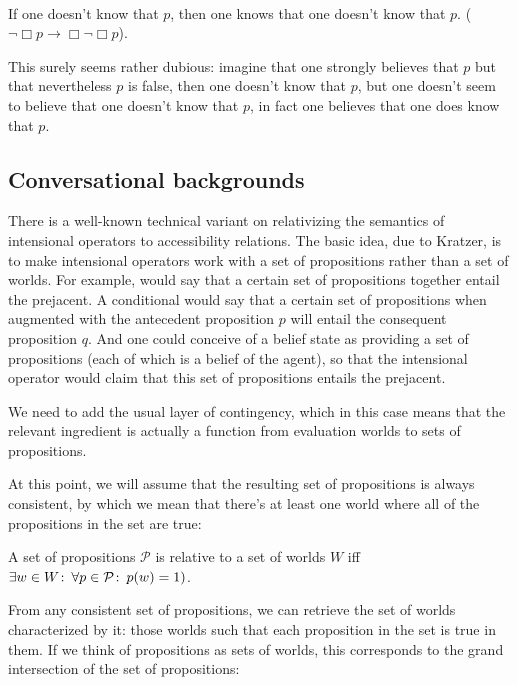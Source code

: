 \ex {}\\
If one doesn't know that $p$, then one knows that one doesn't know that $p$.
($\neg\Box p \rightarrow \Box\neg\Box p$). \xe

This surely seems rather dubious: imagine that one strongly believes that $p$
but that nevertheless $p$ is false, then one doesn't know that $p$, but one
doesn't seem to believe that one doesn't know that $p$, in fact one believes
that one does know that $p$.

\clearpage
\subsection{Conversational backgrounds}
\label{sec:conversational-backgrounds}

%
There is a well-known technical variant on relativizing the semantics of
intensional operators to accessibility relations. The basic idea, due to
Kratzer, is to make intensional operators work with a set of propositions rather
than a set of worlds. For example,  would say that a certain
set of propositions together entail the prejacent. A conditional  would say that a certain set of propositions when augmented with
the antecedent proposition $p$ will entail the consequent proposition $q$.
And one could conceive of a belief state as providing a set of propositions
(each of which is a belief of the agent), so that the intensional operator
 would claim that this set of propositions entails the
prejacent.

We need to add the usual layer of contingency, which in this case means that the
relevant ingredient is actually a function from evaluation worlds to sets of
propositions.

At this point, we will assume that the resulting set of propositions is always
consistent, by which we mean that there's at least one world where all of the
propositions in the set are true:

\ex A set of propositions $\mathcal{P}$ is  relative to a set
of worlds $W$ iff $\exists w\in W\co \forall p\in\mathcal{P}\co p(w)=1)$. \xe

From any consistent set of propositions, we can retrieve the set of worlds
characterized by it: those worlds such that each proposition in the set is true
in them. If we think of propositions as sets of worlds, this corresponds to the
grand intersection of the set of propositions:

